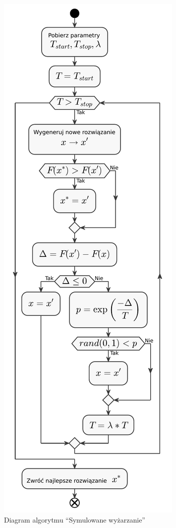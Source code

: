 \begin{figure}[H]
	\centering
	\includegraphics[scale=0.67]{chapters/chapter4/sa.pdf}
	\caption{Diagram algorytmu ``Symulowane wyżarzanie''}
	\label{sa}
\end{figure}
